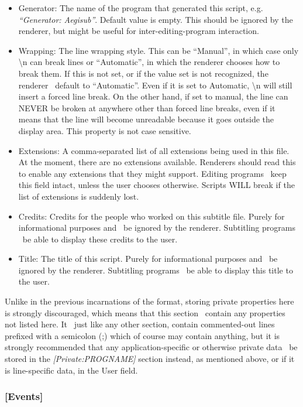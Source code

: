 \documentclass{spec}
\begin{document}
\begin{itemize}
\item Generator: The name of the program that generated this script, e.g. \textit{``Generator: Aegisub''}.
Default value is empty. This should be ignored by the renderer, but might be useful for inter-editing-program
interaction.
\item Wrapping: The line wrapping style. This can be ``Manual'', in which case only \textbackslash{n} can
break lines or ``Automatic'', in which the renderer chooses how to break them. If this is not set, or if the
value set is not recognized, the renderer \must\ default to ``Automatic''.
Even if it is set to Automatic, \textbackslash{n} will still insert a forced line break.
On the other hand, if set to manual, the line can NEVER be broken at anywhere other than forced line breaks,
even if it means that the line will become unreadable because it goes outside the display area.
This property is not case sensitive.
\item Extensions: A comma-separated list of all extensions being used in this file. At the moment, there are
no extensions available. Renderers should read this to enable any extensions that they might support.
Editing programs \must\ keep this field intact, unless the user chooses otherwise. Scripts WILL break
if the list of extensions is suddenly lost.
\item Credits: Credits for the people who worked on this subtitle file. Purely for informational purposes and
\should\ be ignored by the renderer. Subtitling programs \should\ be able to display these credits to the user.
\item Title: The title of this script. Purely for informational purposes and \should\ be ignored by the renderer.
Subtitling programs \should\ be able to display this title to the user.
\end{itemize}

Unlike in the previous incarnations of the format, storing private properties here is strongly discouraged,
which means that this section \shouldnot\ contain any properties not listed here. It \may\, just like any other
section, contain commented-out lines prefixed with a semicolon (;) which of course may contain anything, but it
is strongly recommended that any application-specific or otherwise private data \should\ be stored in the
\textit{[Private:PROGNAME]} section instead, as mentioned above, or if it is line-specific data, in the User field.


\subsubsection{[Events]}
\end{document}
